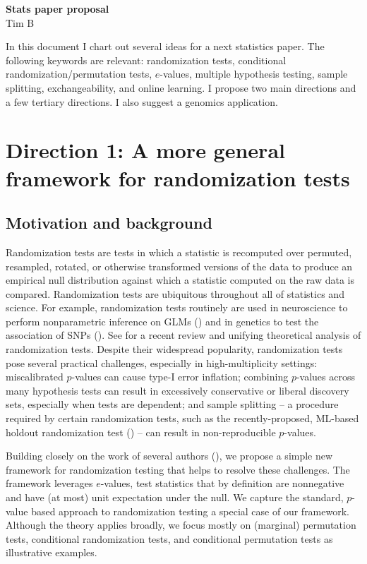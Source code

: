 \documentclass[12pt]{article}
\begin{document}
\begin{center}
\textbf{Stats paper proposal} \\
Tim B
\end{center}

In this document I chart out several ideas for a next statistics paper. The following keywords are relevant: randomization tests, conditional randomization/permutation tests, $e$-values, multiple hypothesis testing, sample splitting, exchangeability, and online learning. I propose two main directions and a few tertiary directions. I also suggest a genomics application.

\section*{Direction 1: A more general framework for randomization tests}

\subsection*{Motivation and background}

Randomization tests are tests in which a statistic is recomputed over permuted, resampled, rotated, or otherwise transformed versions of the data to produce an empirical null distribution against which a statistic computed on the raw data is compared. Randomization tests are ubiquitous throughout all of statistics and science. For example, randomization tests routinely are used in neuroscience to perform nonparametric inference on GLMs (\cite{Winkler2014}) and in genetics to test the association of SNPs (\cite{Johnson2010}). See \cite{Dobriban2021} for a recent review and unifying theoretical analysis of randomization tests. Despite their widespread popularity, randomization tests pose several practical challenges, especially in high-multiplicity settings: miscalibrated $p$-values can cause type-I error inflation; combining $p$-values across many hypothesis tests can result in excessively conservative or liberal discovery sets, especially when tests are dependent; and sample splitting -- a procedure required by certain randomization tests, such as the recently-proposed, ML-based holdout randomization test (\cite{Tansey2021a}) -- can result in non-reproducible $p$-values.

Building closely on the work of several authors (\cite{Wang2020b,Vovk2020,Vovk2021b}), we propose a simple new framework for randomization testing that helps to resolve these challenges. The framework leverages $e$-values, test statistics that by definition are nonnegative and have (at most) unit expectation under the null. We capture the standard, $p$-value based approach to randomization testing a special case of our framework. Although the theory applies broadly, we focus mostly on (marginal) permutation tests, conditional randomization tests, and conditional permutation tests as illustrative examples.
\end{document}
